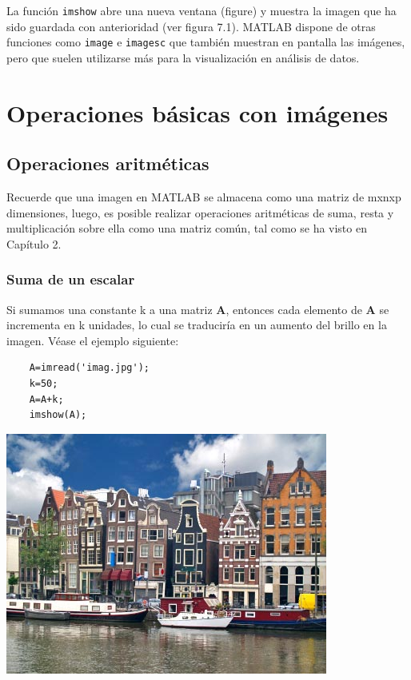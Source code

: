La función \texttt{imshow} abre una nueva ventana (figure) y muestra la imagen que ha sido 
guardada con anterioridad  (ver figura 7.1). MATLAB dispone de otras funciones como 
\texttt{image} e \texttt{imagesc}  que también muestran en pantalla las imágenes, pero que suelen 
utilizarse más para la visualización en análisis de datos.

\section{Operaciones básicas con imágenes}

\subsection{Operaciones aritméticas}

Recuerde que una imagen en MATLAB se almacena como una matriz de mxnxp dimensiones, 
luego, es posible realizar operaciones aritméticas de suma, resta y multiplicación sobre 
ella como una matriz común, tal como se ha visto en Capítulo 2.

\subsubsection{Suma de un escalar}

Si sumamos una constante k a una matriz \textbf{A}, entonces cada elemento de \textbf{A} se incrementa en k 
unidades, lo cual se traduciría en un aumento del brillo en la imagen. Véase el ejemplo siguiente:

\begin{verbatim}
	A=imread('imag.jpg');
	k=50;
	A=A+k;
	imshow(A);
\end{verbatim}

\begin{center}
\includegraphics[scale=0.7]{src/ch7/holland_original.png}
\end{center}


